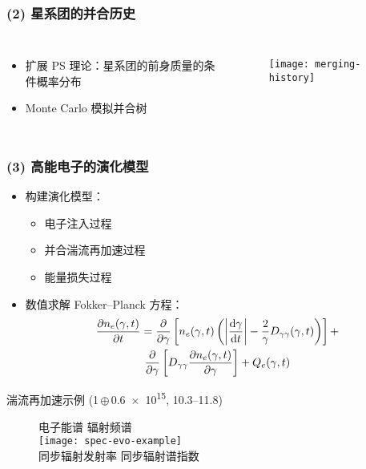 \documentclass{beamer}
\begin{document}
\begin{frame}[subsec]
  \frametitle{(2) 星系团的并合历史}
  \begin{columns}[t,onlytextwidth]
    \begin{itemize}
      \item 扩展 PS 理论：星系团的前身质量的条件概率分布
      \item Monte Carlo 模拟并合树
    \end{itemize}

    \begin{figure}
      \centering
      \texttt{[image: merging-history]}
    \end{figure}
  \end{columns}
\end{frame}

\begin{frame}[subsec]
  \frametitle{(3) 高能电子的演化模型}
  \begin{itemize}
    \item 构建演化模型：
      \begin{itemize}
        \item 电子注入过程
        \item 并合湍流再加速过程
        \item 能量损失过程
      \end{itemize}
    \item 数值求解 Fokker--Planck 方程：
      \begin{multline}
        \frac{\partial n_e(\gamma, t)}{\partial t} =
          \frac{\partial }{\partial \gamma} \left[ n_e(\gamma, t) \left(
            \left| \frac{\text{d}\gamma}{\text{d}t} \right| -
            \frac{2}{\gamma} D_{\gamma\gamma}(\gamma, t) \right) \right] + \\
          \frac{\partial }{\partial \gamma} \left[
          D_{\gamma\gamma} \frac{\partial n_e(\gamma, t)}{\partial \gamma} \right]
          + Q_e(\gamma, t)
      \end{multline}
  \end{itemize}
\end{frame}

\begin{frame}[t]
  \begin{block}{湍流再加速示例
    {\normalfont(1\,$\oplus$\,\SI{0.6e15}{\solarmass},
      \SIrange{10.3}{11.8}{\Gyr})}
  }
    \begin{figure}
      \centering\footnotesize
      \hspace{2.5em} 电子能谱 \hspace{9em} 辐射频谱 \\
      \texttt{[image: spec-evo-example]} \\
      \hspace{2.5em} 同步辐射发射率 \hspace{7em} 同步辐射谱指数
    \end{figure}
  \end{block}
\end{frame}
\end{document}
